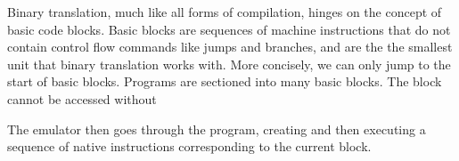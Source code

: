 Binary translation, much like all forms of compilation, hinges on the concept
of basic code blocks.  Basic blocks are sequences of machine instructions that
do not contain control flow commands like jumps and branches, and are the the
smallest unit that binary translation works with.  More concisely, we can only
jump to the start of basic blocks.  Programs are sectioned into many basic
blocks.  The block cannot be accessed without

The emulator then goes through the program, creating and then executing a
sequence of native instructions corresponding to the current block.





